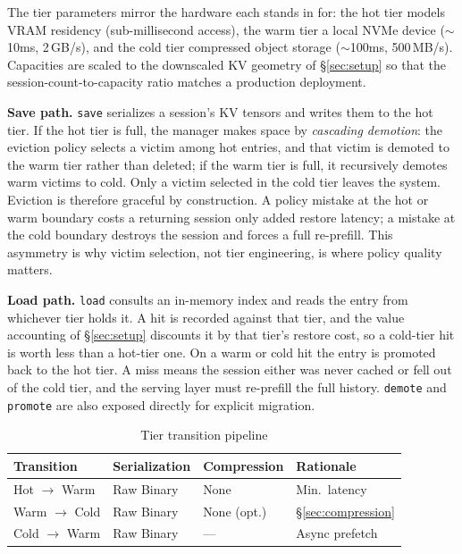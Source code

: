 \documentclass[letterpaper,twocolumn,10pt]{article}
\begin{document}
The tier parameters mirror the hardware each stands in for: the hot tier models VRAM residency (sub-millisecond access), the warm tier a local NVMe device (${\sim}$10ms, 2\,GB/s), and the cold tier compressed object storage (${\sim}$100ms, 500\,MB/s). Capacities are scaled to the downscaled KV geometry of \S\ref{sec:setup} so that the session-count-to-capacity ratio matches a production deployment.

\textbf{Save path.} \texttt{save} serializes a session's KV tensors and writes them to the hot tier. If the hot tier is full, the manager makes space by \emph{cascading demotion}: the eviction policy selects a victim among hot entries, and that victim is demoted to the warm tier rather than deleted; if the warm tier is full, it recursively demotes warm victims to cold. Only a victim selected in the cold tier leaves the system. Eviction is therefore graceful by construction. A policy mistake at the hot or warm boundary costs a returning session only added restore latency; a mistake at the cold boundary destroys the session and forces a full re-prefill. This asymmetry is why victim selection, not tier engineering, is where policy quality matters.

\textbf{Load path.} \texttt{load} consults an in-memory index and reads the entry from whichever tier holds it. A hit is recorded against that tier, and the value accounting of \S\ref{sec:setup} discounts it by that tier's restore cost, so a cold-tier hit is worth less than a hot-tier one. On a warm or cold hit the entry is promoted back to the hot tier. A miss means the session either was never cached or fell out of the cold tier, and the serving layer must re-prefill the full history. \texttt{demote} and \texttt{promote} are also exposed directly for explicit migration.

\begin{table}[t]
\centering
\caption{Tier transition pipeline}
\label{tab:transitions}
\small
\setlength{\tabcolsep}{3pt}
\begin{tabular}{@{}llll@{}}
\toprule
Transition & Serialization & Compression & Rationale \\
\midrule
Hot $\to$ Warm & Raw Binary & None & Min.\ latency \\
Warm $\to$ Cold & Raw Binary & None (opt.) & \S\ref{sec:compression} \\
Cold $\to$ Warm & Raw Binary & --- & Async prefetch \\
\bottomrule
\end{tabular}
\end{table}
\end{document}

